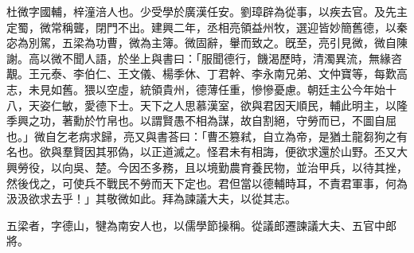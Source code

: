 
\begin{pinyinscope}
杜微字國輔，梓潼涪人也。少受學於廣漢任安。劉璋辟為從事，以疾去官。及先主定蜀，微常稱聾，閉門不出。建興二年，丞相亮領益州牧，選迎皆妙簡舊德，以秦宓為別駕，五梁為功曹，微為主簿。微固辭，轝而致之。旣至，亮引見微，微自陳謝。高以微不聞人語，於坐上與書曰：「服聞德行，饑渴歷時，清濁異流，無緣咨覯。王元泰、李伯仁、王文儀、楊季休、丁君幹、李永南兄弟、文仲寶等，每歎高志，未見如舊。猥以空虛，統領貴州，德薄任重，慘慘憂慮。朝廷主公今年始十八，天姿仁敏，愛德下士。天下之人思慕漢室，欲與君因天順民，輔此明主，以隆季興之功，著勳於竹帛也。以謂賢愚不相為謀，故自割絕，守勞而已，不圖自屈也。」微自乞老病求歸，亮又與書荅曰：「曹丕篡弒，自立為帝，是猶土龍芻狗之有名也。欲與羣賢因其邪偽，以正道滅之。怪君未有相誨，便欲求還於山野。丕又大興勞役，以向吳、楚。今因丕多務，且以境勤農育養民物，並治甲兵，以待其挫，然後伐之，可使兵不戰民不勞而天下定也。君但當以德輔時耳，不責君軍事，何為汲汲欲求去乎！」其敬微如此。拜為諫議大夫，以從其志。

五梁者，字德山，犍為南安人也，以儒學節操稱。從議郎遷諫議大夫、五官中郎將。


\end{pinyinscope}